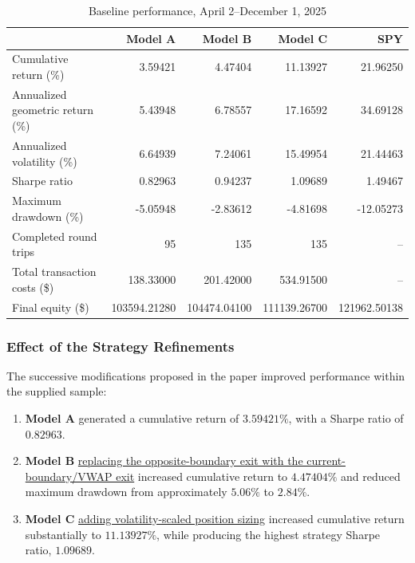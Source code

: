 \documentclass{article}
\begin{document}

\begin{table}[H]
\centering
\caption{Baseline performance, April 2--December 1, 2025}
\label{tab:baseline_results}
\begin{tabular}{lrrrr}
\toprule
 &\textbf{ Model A} &\textbf{ Model B} &\textbf{ Model C} & SPY \\
\midrule
Cumulative return (\%)       
    & 3.59421 & 4.47404 & 11.13927 & 21.96250 \\
Annualized geometric return (\%) 
    & 5.43948 & 6.78557 & 17.16592 & 34.69128 \\
Annualized volatility (\%)   
    & 6.64939 & 7.24061 & 15.49954 & 21.44463 \\
Sharpe ratio                 
    & 0.82963 & 0.94237 & 1.09689 & 1.49467 \\
Maximum drawdown (\%)        
    & -5.05948 & -2.83612 & -4.81698 & -12.05273 \\
Completed round trips        
    & 95 & 135 & 135 & -- \\
Total transaction costs (\$) 
    & 138.33000 & 201.42000 & 534.91500 & -- \\
Final equity (\$)            
    & 103594.21280 & 104474.04100 & 111139.26700 & 121962.50138 \\
\bottomrule
\end{tabular}
\end{table}

\subsubsection{Effect of the Strategy Refinements}

The successive modifications proposed in the paper improved performance within the supplied sample:
\begin{enumerate}
    \item \textbf{Model A} generated a cumulative return of \(3.59421\%\), with a Sharpe ratio of \(0.82963\).
    
    \item \textbf{Model B} \underline{replacing the opposite-boundary exit with the current-boundary/VWAP exit} increased cumulative return to \(4.47404\%\) and reduced maximum drawdown from approximately \(5.06\%\) to \(2.84\%\).
    
    \item \textbf{Model C} \underline{adding volatility-scaled position sizing} increased cumulative return substantially to \(11.13927\%\), while producing the highest strategy Sharpe ratio, \(1.09689\).
\end{enumerate}
\end{document}
